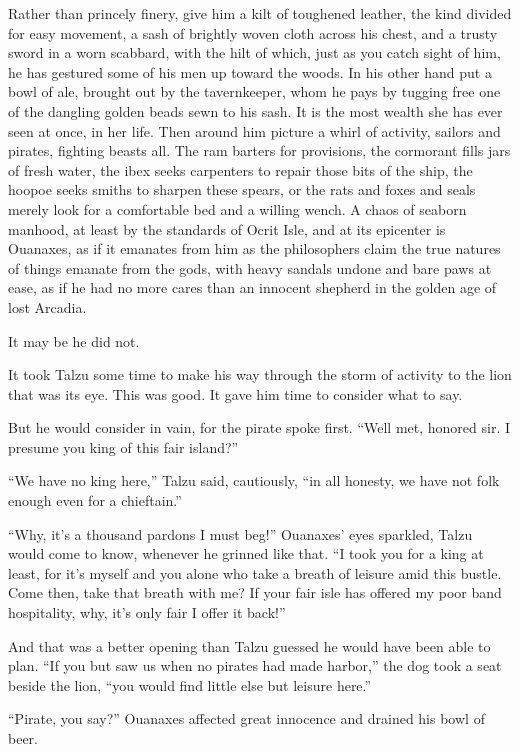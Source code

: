 Rather than princely finery, give him a kilt of toughened leather, the kind divided for easy movement, a sash of brightly woven cloth across his chest, and a trusty sword in a worn scabbard, with the hilt of which, just as you catch sight of him, he has gestured some of his men up toward the woods. In his other hand put a bowl of ale, brought out by the tavernkeeper, whom he pays by tugging free one of the dangling golden beads sewn to his sash. It is the most wealth she has ever seen at once, in her life. Then around him picture a whirl of activity, sailors and pirates, fighting beasts all. The ram barters for provisions, the cormorant fills jars of fresh water, the ibex seeks carpenters to repair those bits of the ship, the hoopoe seeks smiths to sharpen these spears, or the rats and foxes and seals merely look for a comfortable bed and a willing wench. A chaos of seaborn manhood, at least by the standards of Ocrit Isle, and at its epicenter is Ouanaxes, as if it emanates from him as the philosophers claim the true natures of things emanate from the gods, with heavy sandals undone and bare paws at ease, as if he had no more cares than an innocent shepherd in the golden age of lost Arcadia.

It may be he did not.

It took Talzu some time to make his way through the storm of activity to the lion that was its eye. This was good. It gave him time to consider what to say.

But he would consider in vain, for the pirate spoke first. ``Well met, honored sir. I presume you king of this fair island?''

``We have no king here,'' Talzu said, cautiously, ``in all honesty, we have not folk enough even for a chieftain.''

``Why, it's a thousand pardons I must beg!'' Ouanaxes' eyes sparkled, Talzu would come to know, whenever he grinned like that. ``I took you for a king at least, for it's myself and you alone who take a breath of leisure amid this bustle. Come then, take that breath with me? If your fair isle has offered my poor band hospitality, why, it's only fair I offer it back!''

And that was a better opening than Talzu guessed he would have been able to plan. ``If you but saw us when no pirates had made harbor,'' the dog took a seat beside the lion, ``you would find little else but leisure here.''

``Pirate, you say?'' Ouanaxes affected great innocence and drained his bowl of beer.

